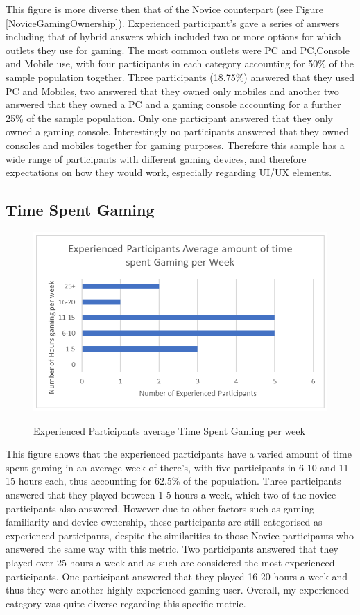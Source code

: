 This figure is more diverse then that of the Novice counterpart (see Figure \ref{NoviceGamingOwnership}). Experienced participant's gave a series of answers including that of hybrid answers which included two or more options for which outlets they use for gaming. The most common outlets were PC and PC,Console and Mobile use, with four participants in each category accounting for 50\% of the sample population together. Three participants (18.75\%) answered that they used PC and Mobiles, two answered that they owned only mobiles and another two answered that they owned a PC and a gaming console accounting for a further 25\% of the sample population. Only one participant answered that they only owned a gaming console. Interestingly no participants answered that they owned consoles and mobiles together for gaming purposes. Therefore this sample has a wide range of participants with different gaming devices, and therefore expectations on how they would work, especially regarding UI/UX elements.

\subsection{Time Spent Gaming}
\begin{figure}[H]
\includegraphics[width=\linewidth]{Screenshots/DemographicsQuestionaires/experiencedQuestionaireData/experiencedTimeSpentGaming.png}
\label{ExperiencedGamingTime}
\caption{Experienced Participants average Time Spent Gaming per week}
\end{figure}

This figure shows that the experienced participants have a varied amount of time spent gaming in an average week of there's, with five participants in 6-10 and 11-15 hours each, thus accounting for 62.5\% of the population. Three participants answered that they played between 1-5 hours a week, which two of the novice participants also answered. However due to other factors such as gaming familiarity and device ownership, these participants are still categorised as experienced participants, despite the similarities to those Novice participants who answered the same way with this metric. Two participants answered that they played over 25 hours a week and as such are considered the most experienced participants. One participant answered that they played 16-20 hours a week and thus they were another highly experienced gaming user. Overall, my experienced category was quite diverse regarding this specific metric.


